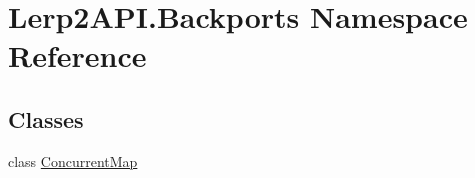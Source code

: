 \hypertarget{namespace_lerp2_a_p_i_1_1_backports}{}\section{Lerp2\+A\+P\+I.\+Backports Namespace Reference}
\label{namespace_lerp2_a_p_i_1_1_backports}
\subsection*{Classes}
\begin{DoxyCompactItemize}
\item 
class \hyperlink{class_lerp2_a_p_i_1_1_backports_1_1_concurrent_map}{Concurrent\+Map}
\end{DoxyCompactItemize}
